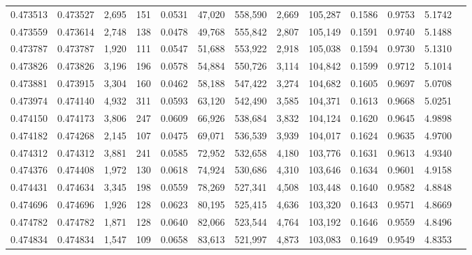 \begin{tabular}{rrrrrrrrrrrrr}
0.473513 & 0.473527 & 2,695 &   151 &                                     0.0531 &  47,020 & 558,590 &   2,669 & 105,287 & 0.1586 & 0.9753 & 5.1742 \\
0.473559 & 0.473614 & 2,748 &   138 &                                     0.0478 &  49,768 & 555,842 &   2,807 & 105,149 & 0.1591 & 0.9740 & 5.1488 \\
0.473787 & 0.473787 & 1,920 &   111 &                                     0.0547 &  51,688 & 553,922 &   2,918 & 105,038 & 0.1594 & 0.9730 & 5.1310 \\
0.473826 & 0.473826 & 3,196 &   196 &                                     0.0578 &  54,884 & 550,726 &   3,114 & 104,842 & 0.1599 & 0.9712 & 5.1014 \\
0.473881 & 0.473915 & 3,304 &   160 &                                     0.0462 &  58,188 & 547,422 &   3,274 & 104,682 & 0.1605 & 0.9697 & 5.0708 \\
0.473974 & 0.474140 & 4,932 &   311 &                                     0.0593 &  63,120 & 542,490 &   3,585 & 104,371 & 0.1613 & 0.9668 & 5.0251 \\
0.474150 & 0.474173 & 3,806 &   247 &                                     0.0609 &  66,926 & 538,684 &   3,832 & 104,124 & 0.1620 & 0.9645 & 4.9898 \\
0.474182 & 0.474268 & 2,145 &   107 &                                     0.0475 &  69,071 & 536,539 &   3,939 & 104,017 & 0.1624 & 0.9635 & 4.9700 \\
0.474312 & 0.474312 & 3,881 &   241 &                                     0.0585 &  72,952 & 532,658 &   4,180 & 103,776 & 0.1631 & 0.9613 & 4.9340 \\
0.474376 & 0.474408 & 1,972 &   130 &                                     0.0618 &  74,924 & 530,686 &   4,310 & 103,646 & 0.1634 & 0.9601 & 4.9158 \\
0.474431 & 0.474634 & 3,345 &   198 &                                     0.0559 &  78,269 & 527,341 &   4,508 & 103,448 & 0.1640 & 0.9582 & 4.8848 \\
0.474696 & 0.474696 & 1,926 &   128 &                                     0.0623 &  80,195 & 525,415 &   4,636 & 103,320 & 0.1643 & 0.9571 & 4.8669 \\
0.474782 & 0.474782 & 1,871 &   128 &                                     0.0640 &  82,066 & 523,544 &   4,764 & 103,192 & 0.1646 & 0.9559 & 4.8496 \\
0.474834 & 0.474834 & 1,547 &   109 &                                     0.0658 &  83,613 & 521,997 &   4,873 & 103,083 & 0.1649 & 0.9549 & 4.8353 \\

\end{tabular}
